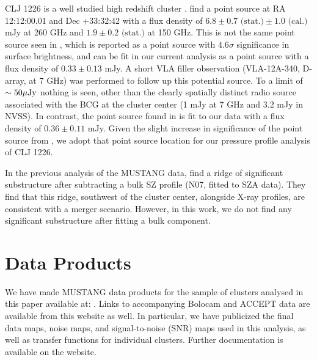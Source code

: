 \documentclass[iop,numberedappendix,apj]{emulateapj}
\begin{document}

CLJ 1226 is a well studied high redshift cluster \citep[e.g.][]{mroczkowski2009,bulbul2010,adam2015}. 
\citet{adam2015} find a point source at RA 12:12:00.01 and Dec +33:32:42 with a flux density of 
$6.8 \pm 0.7 \text{ (stat.)} \pm 1.0 \text{ (cal.)}$ mJy at 260 GHz and $1.9 \pm 0.2 \text{ (stat.)}$ at 150 GHz. 
This is not the same point source seen in \citet{korngut2011}, which is reported as a point source
with $4.6\sigma$ significance in surface brightness, and can be fit in our current analysis as a point source 
with a flux density of $0.33 \pm 0.13$ mJy. A short VLA filler observation (VLA-12A-340, D-array, at 7 GHz) 
was performed to follow up this potential source. To a limit of $\sim 50 {\rm \mu Jy}$ nothing is seen, 
other than the clearly spatially distinct radio source associated with the BCG at the cluster center 
(1 mJy at 7 GHz and 3.2 mJy in NVSS). In contrast, the point source found in \citet{adam2015} is fit to our 
data with a flux density of $0.36 \pm 0.11$ mJy. Given the slight increase in significance of the point source
from \citet{adam2015}, we adopt that point source location for our pressure profile analysis of CLJ 1226.
 

In the previous analysis of the MUSTANG data, \citet{korngut2011} find a ridge of significant substructure after 
subtracting a bulk SZ profile (N07, fitted to SZA data). They find that this ridge, southwest of the cluster
center, alongside X-ray profiles, are consistent with a merger scenario. However, in this work, we do not find
any significant substructure after fitting a bulk component.

\section{Data Products}

We have made MUSTANG data products for the sample of clusters analysed in this paper available at: 
. Links to accompanying
Bolocam and ACCEPT data are available from this website as well. In particular, we have publicized the final
data maps, noise maps, and signal-to-noise (SNR) maps used in this analysis, as well as transfer functions
for individual clusters. Further documentation is available on the website.





\label{references}
\end{document}
